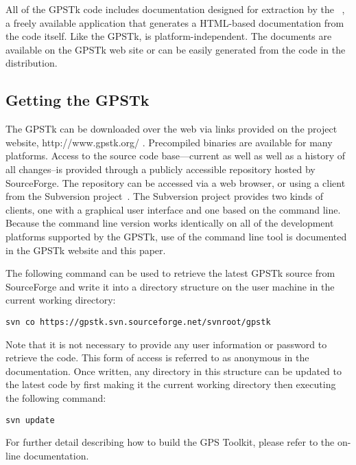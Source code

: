 All of the GPSTk code includes documentation designed for extraction
by the ~\cite{doxygen}, a freely
available application that generates a HTML-based documentation from the
code itself. Like the GPSTk,  is platform-independent. The
 documents are available on the GPSTk web site or can be easily
generated from the code in the distribution.

\subsection*{Getting the GPSTk}

The GPSTk can be downloaded over the web via links provided on the project
website, http://www.gpstk.org/ . Precompiled binaries are available for many platforms. 
Access to the source code base---current as well as well as a history of all changes--is provided through a
publicly accessible repository hosted by SourceForge.  The repository can
be accessed via a web browser, or using a client from the Subversion
project~\cite{subversion, subversionbook}. The Subversion project provides two kinds of clients, one with 
a graphical user interface and one based on the command line. Because
the command line version works identically on all of the development
platforms supported by the GPSTk, use of the command line tool 
is documented in the GPSTk website and this paper. 

The following command can be used to retrieve the
latest GPSTk source from SourceForge and write it into a directory structure on
the user machine in the current working directory:

\begin{scriptsize}
\begin{lstlisting}
svn co https://gpstk.svn.sourceforge.net/svnroot/gpstk
\end{lstlisting}
\end{scriptsize}

Note that it is not necessary to provide any user information or password to retrieve the code.
This form of access is referred to as anonymous in the  documentation.
Once written, any directory in this structure can be updated to the latest code by first making it the 
current working directory then executing the following command:
%
\begin{scriptsize}
\begin{lstlisting}
svn update
\end{lstlisting}
\end{scriptsize}
%
For further detail describing how to build the GPS Toolkit, please refer to the on-line documentation.


